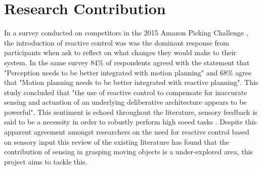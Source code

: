 \section{Research Contribution}
In a survey conducted on competitors in the 2015 Amazon Picking Challenge \cite{APCObservations}, the introduction of reactive control was was the dominant response from participants when ask to reflect on what changes they would make to their system. In the same survey 84\% of respondents agreed with the statement that "Perception needs to be better integrated with motion planning" and 68\% agree that "Motion planning needs to be better integrated with reactive planning". This study concluded that "the use of reactive control to compensate for inaccurate sensing and actuation of an underlying deliberative architecture appears to be powerful". This sentiment is echoed throughout the literature, sensory feedback is said to be a necessity in order to robustly perform high soeed tasks \cite{Senoo2006}. Despite this apparent agreement amongst researchers on the need for reactive control based on sensory input this review of the existing literature has found that the contribution of sensing in grasping moving objects is a under-explored area, this project aims to tackle this.





